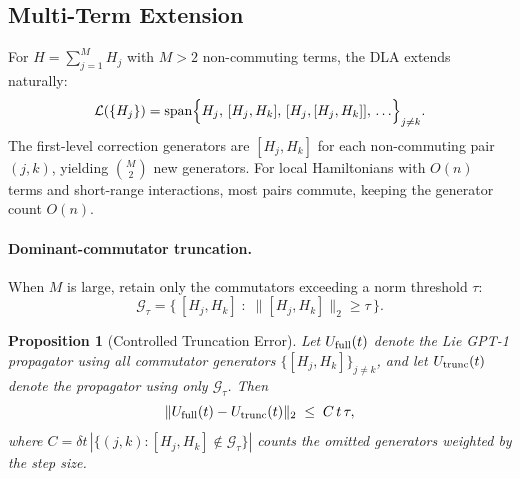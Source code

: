 \documentclass[aps,prxquantum,twocolumn,nofootinbib]{revtex4-2}
\newtheorem{proposition}{Proposition}
\begin{document}
\subsection{Multi-Term Extension}
\label{sec:multiterm}

For $H=\sum_{j=1}^M H_j$ with $M>2$ non-commuting terms,
the DLA extends naturally:
\begin{equation}
  \mathcal{L}(\{H_j\})
  = \mathrm{span}\Bigl\{H_j,\,[H_j,H_k],\,[H_j,[H_j,H_k]],\,\ldots\Bigr\}_{j\neq k}.
\end{equation}
The first-level correction generators are
$[H_j,H_k]$ for each non-commuting pair $(j,k)$, yielding
$\binom{M}{2}$ new generators. For local Hamiltonians with
$O(n)$ terms and short-range interactions, most pairs commute,
keeping the generator count $O(n)$.

\paragraph{Dominant-commutator truncation.}
When $M$ is large, retain only the commutators exceeding a
norm threshold $\tau$:
\begin{equation}
  \mathcal{G}_{\tau}
  = \{\,[H_j,H_k] \;:\; \|[H_j,H_k]\|_2 \geq \tau\,\}.
\end{equation}

\begin{proposition}[Controlled Truncation Error]
  \label{prop:truncation}
  Let $U_{\rm full}(t)$ denote the Lie GPT-1 propagator using \emph{all}
  commutator generators $\{[H_j,H_k]\}_{j\neq k}$, and let
  $U_{\rm trunc}(t)$ denote the propagator using only
  $\mathcal{G}_\tau$.  Then
  \begin{equation}
    \|U_{\rm full}(t) - U_{\rm trunc}(t)\|_2
    \;\leq\;
    C\, t\, \tau,
    \label{eq:trunc-bound}
  \end{equation}
  where $C = \delta t\,|\{(j,k):[H_j,H_k]\notin\mathcal{G}_\tau\}|$ counts
  the omitted generators weighted by the step size.
\end{proposition}
\end{document}
